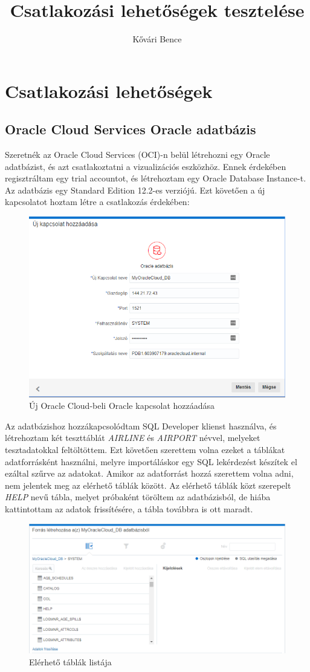 \author{Kővári Bence}

\title{Csatlakozási lehetőségek tesztelése}

\section{Csatlakozási lehetőségek}
\subsection{Oracle Cloud Services Oracle adatbázis}
Szeretnék az Oracle Cloud Services (OCI)-n belül létrehozni egy Oracle adatbázist, és azt csatlakoztatni a vizualizációs eszközhöz. Ennek érdekében regisztráltam egy trial accountot, és létrehoztam egy Oracle Database Instance-t. Az adatbázis egy Standard Edition 12.2-es verziójú. Ezt követően a új kapcsolatot hoztam létre a csatlakozás érdekében:
\begin{figure}[h!]
	\centering
	\includegraphics[width=0.9\linewidth,height=0.45\linewidth]{bence_imgs/add_connection_oracleclouddb}
	\caption{Új Oracle Cloud-beli Oracle kapcsolat hozzáadása}
	\label{fig:addconnectionoracleclouddb}
\end{figure}
Az adatbázishoz hozzákapcsolódtam SQL Developer klienst használva, és létrehoztam két teszttáblát \textit{AIRLINE} és \textit{AIRPORT} névvel, melyeket tesztadatokkal feltöltöttem. Ezt követően szerettem volna ezeket a táblákat adatforrásként használni, melyre importáláskor egy SQL lekérdezést készítek el ezáltal szűrve az adatokat. Amikor az adatforrást hozzá szerettem volna adni, nem jelentek meg az elérhető táblák között. Az elérhető táblák közt szerepelt \textit{HELP} nevű tábla, melyet próbaként töröltem az adatbázisból, de hiába kattintottam az adatok frissítésére, a tábla továbbra is ott maradt. 
\newpage\begin{figure}[h!]
	\centering
	\includegraphics[width=0.7\linewidth]{bence_imgs/add_datasource_fromdb}
	\caption{Elérhető táblák listája}
	\label{fig:adddatasourcefromdb}
\end{figure}
